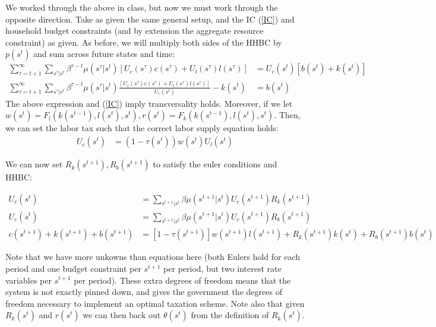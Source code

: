 \documentclass[11pt]{article} %
\begin{document}
We worked through the above in class, but now we must work through the opposite direction. Take as given the same general setup, and the IC (\ref{IC}) and household budget constraints (and by extension the aggregate resource constraint) as given. As before, we will multiply both sides of the HHBC by $p(s^t)$ and sum across future states and time:
\begin{align*}
\sum_{\tau=t+1}^{\infty}\sum_{s^{\tau}|s^t} \beta^{\tau - t}\mu(s^{\tau}|s^t)[U_c(s^{\tau})c(s^{\tau})+U_l(s^{\tau})l(s^{\tau})] &= U_c(s^t)[b(s^t)+k(s^t)] \\
 \sum_{\tau=t+1}^{\infty}\sum_{s^{\tau}|s^t} \beta^{\tau - t}\mu(s^{\tau}|s^t)\frac{[U_c(s^{\tau})c(s^{\tau})+U_l(s^{\tau})l(s^{\tau})]}{U_c(s^t)} - k(s^t)  &= b(s^t)
\end{align*}
The above expression and (\ref{IC}) imply transversality holds. Moreover, if we let $w(s^t) = F_l(k(s^{t-1}),l(s^t),s^t), r(s^t) = F_k(k(s^{t-1}),l(s^t),s^t)$. Then, we can set the labor tax such that the correct labor supply equation holds:
\begin{align*}
U_c(s^t) &= (1-\tau(s^t))w(s^t)U_l(s^t)
\end{align*}

We can now set $R_k(s^{t+1}),R_{b}(s^{t+1})$ to satisfy the euler conditions and HHBC:

\begin{align*}
U_c(s^t) &= \sum_{s^{t+1}|s^t} \beta \mu(s^{t+1}|s^t)U_c(s^{t+1})R_k(s^{t+1})\\
U_c(s^t) &= \sum_{s^{t+1}|s^t} \beta \mu(s^{t+1}|s^t)U_c(s^{t+1})R_b(s^{t+1})\\
c(s^{t+1}) + k(s^{t+1}) + b(s^{t+1}) &= [1-\tau(s^{t+1})]w(s^{t+1})l(s^{t+1}) + R_k(s^{t+1})k(s^t) + R_b(s^{t+1})b(s^t)
\end{align*}

Note that we have more unkowns than equations here (both Eulers hold for each period and one budget constraint per $s^{t+1}$ per period, but two interest rate variables per $s^{t+1}$ per period). These extra degrees of freedom means that the system is not exactly pinned down, and gives the government the degrees of freedom necessary to implement an optimal taxation scheme. Note also that given $R_k(s^t)$ and $r(s^t)$ we can then back out $\theta(s^t)$ from the definition of $R_k(s^t).$
\end{document}
